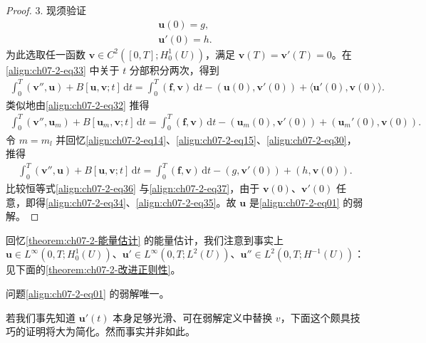 \documentclass[../../main.tex]{subfiles}
\begin{document}
\begin{proof}
3. 现须验证
\begin{align}
\mathbf{u}(0)=g,\label{align:ch07-2-eq34}\\
\mathbf{u}'(0)=h.\label{align:ch07-2-eq35}
\end{align}
为此选取任一函数 $\mathbf{v}\in C^2([0,T];H^1_0(U))$，满足 $\mathbf{v}(T)=\mathbf{v}'(T)=0$。在\eqref{align:ch07-2-eq33} 中关于 $t$ 分部积分两次，得到
\begin{align}
\int_0^T (\mathbf{v}'',\mathbf{u})+B[\mathbf{u},\mathbf{v};t]\,\mathrm{d}t = \int_0^T (\mathbf{f},\mathbf{v})\,\mathrm{d}t - (\mathbf{u}(0),\mathbf{v}'(0)) + \langle\mathbf{u}'(0),\mathbf{v}(0)\rangle.\label{align:ch07-2-eq36}
\end{align}
类似地由\eqref{align:ch07-2-eq32} 推得
\begin{align*}
\int_0^T (\mathbf{v}'',\mathbf{u}_m)+B[\mathbf{u}_m,\mathbf{v};t]\,\mathrm{d}t = \int_0^T (\mathbf{f},\mathbf{v})\,\mathrm{d}t - (\mathbf{u}_m(0),\mathbf{v}'(0)) + (\mathbf{u}_m'(0),\mathbf{v}(0)).
\end{align*}
令 $m=m_l$ 并回忆\eqref{align:ch07-2-eq14}、\eqref{align:ch07-2-eq15}、\eqref{align:ch07-2-eq30}，推得
\begin{align}
\int_0^T (\mathbf{v}'',\mathbf{u})+B[\mathbf{u},\mathbf{v};t]\,\mathrm{d}t = \int_0^T (\mathbf{f},\mathbf{v})\,\mathrm{d}t - (g,\mathbf{v}'(0)) + (h,\mathbf{v}(0)).\label{align:ch07-2-eq37}
\end{align}
比较恒等式\eqref{align:ch07-2-eq36} 与\eqref{align:ch07-2-eq37}，由于 $\mathbf{v}(0)$、$\mathbf{v}'(0)$ 任意，即得\eqref{align:ch07-2-eq34}、\eqref{align:ch07-2-eq35}。故 $\mathbf{u}$ 是\eqref{align:ch07-2-eq01} 的弱解。
\end{proof}

回忆\cref{theorem:ch07-2-能量估计} 的能量估计，我们注意到事实上 $\mathbf{u}\in L^\infty(0,T;H^1_0(U))$、$\mathbf{u}'\in L^\infty(0,T;L^2(U))$、$\mathbf{u}''\in L^2(0,T;H^{-1}(U))$：见下面的\cref{theorem:ch07-2-改进正则性}。

\begin{theorem}[弱解的唯一性。]\label{theorem:ch07-2-弱解的唯一性}问题\eqref{align:ch07-2-eq01} 的弱解唯一。
\end{theorem}

若我们事先知道 $\mathbf{u}'(t)$ 本身足够光滑、可在弱解定义中替换 $v$，下面这个颇具技巧的证明将大为简化。然而事实并非如此。
\end{document}
